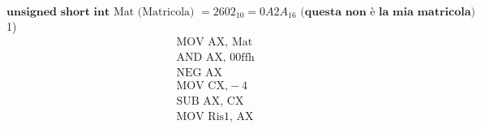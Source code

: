 \documentclass[a4paper, 12pt]{article} %
\begin{document}
$ \textbf{unsigned short int } \text{Mat (Matricola) } = 2602_{10} = 0A2A_{16} \textbf{ (questa non è la mia matricola)}  $ \\

\textsf{\large{\color{red} 1) }} \\

\begin{align*}
&\text{MOV AX,} \text{ Mat} \\
&\text{AND AX,} \text{ 00ffh} \\
&\text{NEG AX} \\
&\text{MOV CX,} -4 \\
&\text{SUB AX,} \text{ CX} \\
&\text{MOV Ris1,} \text{ AX} \\
\end{align*}
\end{document}
